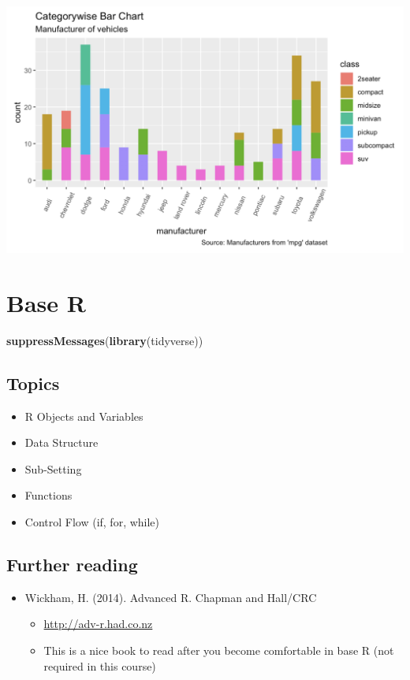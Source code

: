 \documentclass[]{book}
\newenvironment{Shaded}{\begin{snugshade}}{\end{snugshade}}
\newcommand{\KeywordTok}[1]{\textcolor[rgb]{0.13,0.29,0.53}{\textbf{#1}}}
\newcommand{\NormalTok}[1]{#1}
\providecommand{\tightlist}{%
  \setlength{\itemsep}{0pt}\setlength{\parskip}{0pt}}
\begin{document}
\includegraphics{practice2.png}

\hypertarget{base-r}{%
\chapter{Base R}\label{base-r}}

\begin{Shaded}
\begin{Highlighting}[]
\KeywordTok{suppressMessages}\NormalTok{(}\KeywordTok{library}\NormalTok{(tidyverse))}
\end{Highlighting}
\end{Shaded}

\hypertarget{topics}{%
\section{Topics}\label{topics}}

\begin{itemize}
\tightlist
\item
  R Objects and Variables
\item
  Data Structure
\item
  Sub-Setting
\item
  Functions
\item
  Control Flow (if, for, while)
\end{itemize}

\hypertarget{further-reading}{%
\section{Further reading}\label{further-reading}}

\begin{itemize}
\tightlist
\item
  Wickham, H. (2014). Advanced R. Chapman and Hall/CRC

  \begin{itemize}
  \tightlist
  \item
    \url{http://adv-r.had.co.nz}
  \item
    This is a nice book to read after you become comfortable in base R (not required in this course)
  \end{itemize}
\end{itemize}
\end{document}
